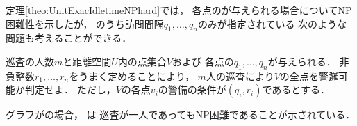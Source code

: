 




定理\ref{theo:UnitExacIdletimeNPhard}では，
各点の{\exactIdletime}が与えられる場合についてNP困難性を示したが，
{\exactIdletime}のうち訪問間隔$q_1, \ldots, q_n$のみが指定されている
次のような問題も考えることができる．

\begin{intervalSpecifiedPatrollingProblemDecision}
  巡査の人数$m$と距離空間$U$内の点集合$V$および
  各点の{\exactInterval}$q_1, \ldots, q_n$が与えられる．
  非負整数$r_1, \ldots, r_n$をうまく定めることにより，
  $m$人の巡査により$V$の全点を警邏可能か判定せよ．
  ただし，$V$の各点$v_i$の警備の条件が{\exactIdletime}$(q_i, r_i)$であるとする．
\end{intervalSpecifiedPatrollingProblemDecision}

グラフが{\graphUnit}の場合，
{\intervalSpecifiedPatProbDecision}は
巡査が一人であってもNP困難であることが示されている\cite{kawamura2015simple}．





